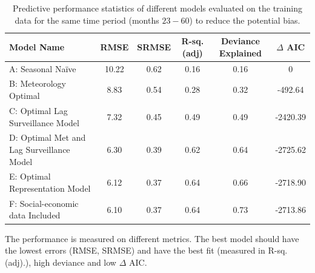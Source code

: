 \documentclass{bmcart}
\begin{document}
\begin{table}[h!]
	\centering
	\begin{tabular}{|lccccc|}
		\hline
		\textbf{Model Name} & \textbf{RMSE} & \textbf{SRMSE} & \textbf{R-sq.(adj)} & \textbf{Deviance Explained} & \textbf{$\Delta$ AIC} \\ 
		\hline
		A: Seasonal Na\"{i}ve  & 10.22 & 0.62 & 0.16 & 0.16 & 0\\ 
		B: Meteorology Optimal & 8.83 & 0.54 & 0.28 & 0.32 & -492.64\\ 
		C: Optimal Lag Surveillance Model  &  7.32 & 0.45 & 0.49 & 0.49 & -2420.39 \\ 
		D: Optimal Met and Lag Surveillance Model  & 6.30 & 0.39 & 0.62 & 0.64 &  -2725.62\\ 
		E: Optimal Representation Model & 6.12 & 0.37 & 0.64 & 0.66 & -2718.90\\ 
		F: Social-economic data Included & 6.10 & 0.37 & 0.64 & 0.73 & -2713.86 \\ 
		\hline
	\end{tabular}
	\caption{Predictive performance statistics of different models evaluated on the training data for the same time period  (months $23-60$) to reduce the potential bias.} The performance is measured on different metrics. The best model should have the lowest errors (RMSE, SRMSE) and have the best fit (measured in R-sq.(adj).), high deviance and low $\Delta$ AIC.
	\label{resultsPrediction}
\end{table}











\end{document}
